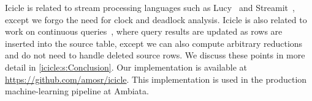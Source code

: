 Icicle is related to stream processing languages such as Lucy~\cite{mandel2010lucy} and Streamit~\cite{thies2002streamit}, except we forgo the need for clock and deadlock analysis.
Icicle is also related to work on continuous queries~\cite{arasu2003cql}, where query results are updated as rows are inserted into the source table, except we can also compute arbitrary reductions and do not need to handle deleted source rows.
We discuss these points in more detail in \cref{icicle:s:Conclusion}.
Our implementation is available at \url{https://github.com/amosr/icicle}.
This implementation is used in the production machine-learning pipeline at Ambiata.

